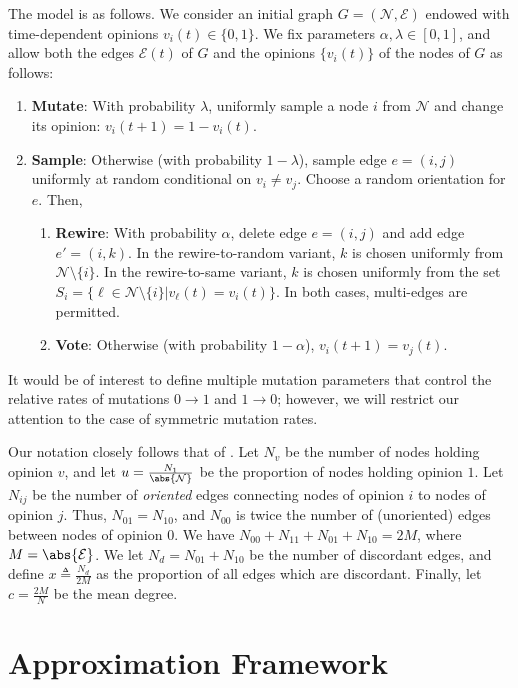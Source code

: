 \documentclass[english]{scrartcl}
\begin{document}
	The model is as follows. We consider an initial graph $G = (\mathcal{N}, \mathcal{E})$ endowed with time-dependent opinions $v_i(t) \in \{0,1\}$. We fix parameters $\alpha,\lambda \in [0,1]$, and allow both the edges $\mathcal{E}(t)$ of $G$ and the opinions $\{v_i(t)\}$ of the nodes of $G$ as follows:  
	\begin{enumerate}
		\item \textbf{Mutate}: With probability $\lambda$, uniformly sample a node $i$ from $\mathcal{N}$ and change its opinion: $v_i(t+1) = 1-v_i(t) $. 
		\item \textbf{Sample}: Otherwise (with probability $1-\lambda$), sample edge $e = (i,j)$ uniformly at random conditional on $v_i \neq v_j$. Choose a random orientation for $e$.  Then, 
		\begin{enumerate}
			\item \textbf{Rewire}: With probability $\alpha$, delete edge $e = (i,j)$ and add edge $e' = (i,k)$. In the rewire-to-random variant, $k$ is chosen uniformly from $\mathcal{N}\setminus \{i\}$. In the rewire-to-same variant, $k$ is chosen uniformly from the set $S_i = \{\ell \in \mathcal{N}\setminus \{i\} | v_\ell(t) = v_i(t)\}$. In both cases, multi-edges are permitted. 
			\item \textbf{Vote}: Otherwise (with probability $1-\alpha$),  $v_i(t+1) = v_j(t)$. 
		\end{enumerate}
	\end{enumerate}
	It would be of interest to define multiple mutation parameters that control the relative rates of mutations $0\rightarrow 1$ and $1 \rightarrow 0$; however, we will restrict our attention to the case of symmetric mutation rates. 

	Our notation closely follows that of \cite{Durrett2012}. Let $N_v$ be the number of nodes holding opinion $v$, and let $u = \frac{N_1}{\abs{\mathcal{N}}}$ be the proportion of nodes holding opinion $1$. Let $N_{ij}$ be the number of \emph{oriented} edges connecting nodes of opinion $i$ to nodes of opinion $j$. Thus, $N_{01} = N_{10}$, and $N_{00}$ is twice the number of (unoriented) edges between nodes of opinion $0$. We have $N_{00} + N_{11} + N_{01} + N_{10} = 2M$, where $M = \abs{\mathcal{E}}$. We let $N_d = N_{01} + N_{10}$ be the number of discordant edges, and  define $x \triangleq \frac{N_d}{2M}$ as the proportion of all edges which are discordant. Finally, let $c = \frac{2M}{N}$ be the mean degree. 

\section{Approximation Framework}
\end{document}
